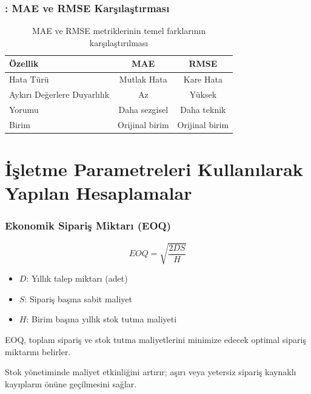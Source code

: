 \documentclass[12pt]{beamer}
\begin{document}
\begin{frame}
	\frametitle{\insertsection: MAE ve RMSE Karşılaştırması}
	\begin{table}
		\centering
		\small
		\begin{tabular}{l c c}
			\toprule
			\textbf{Özellik}            & \textbf{MAE}   & \textbf{RMSE} \\
			\midrule
			Hata Türü                   & Mutlak Hata    & Kare
			Hata                                                         \\
			Aykırı Değerlere Duyarlılık & Az             & Yüksek
			\\
			Yorumu                      & Daha sezgisel  & Daha
			teknik                                                       \\
			Birim                       & Orijinal birim &
			Orijinal birim                                               \\
			\bottomrule
		\end{tabular}
		\caption{\small MAE ve RMSE metriklerinin temel farklarının
			karşılaştırılması}
	\end{table}
\end{frame}


\section{İşletme Parametreleri Kullanılarak Yapılan Hesaplamalar}
\begin{frame}
	\frametitle{Ekonomik Sipariş Miktarı (EOQ)}
	\begin{equation}
		EOQ = \sqrt{\frac{2DS}{H}}
	\end{equation}
	\begin{itemize}
		\item $D$: Yıllık talep miktarı (adet)
		\item $S$: Sipariş başına sabit maliyet
		\item $H$: Birim başına yıllık stok tutma maliyeti
	\end{itemize}

	\begin{tcolorbox}
		EOQ, toplam sipariş ve stok tutma maliyetlerini minimize edecek
		optimal sipariş miktarını belirler.
	\end{tcolorbox}

	\begin{tcolorbox}
		Stok yönetiminde maliyet etkinliğini artırır; aşırı veya
		yetersiz sipariş kaynaklı kayıpların önüne geçilmesini sağlar.
	\end{tcolorbox}
\end{frame}
\end{document}
